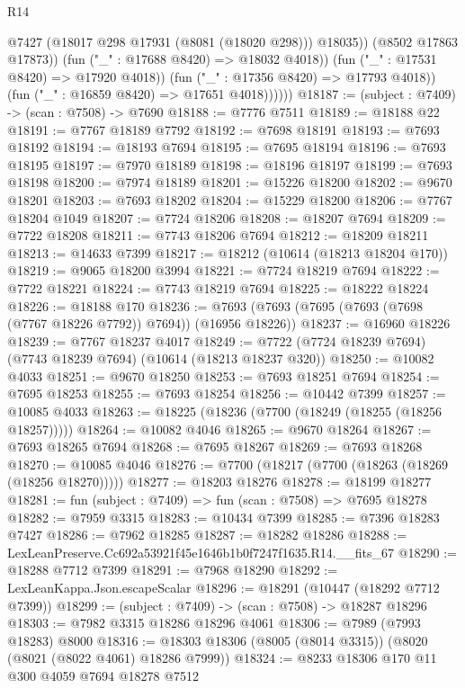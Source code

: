 \begin{lexlean}{R14}
\begin{coremodule}
                          @7427
                          (@18017 @298 @17931 (@8081 (@18020 @298)))
                          @18035))
                      (@8502 @17863 @17873))
                    (fun ("_" : @17688 @8420) => @18032 @4018))
                  (fun ("_" : @17531 @8420) => @17920 @4018))
                (fun ("_" : @17356 @8420) => @17793 @4018))
              (fun ("_" : @16859 @8420) => @17651 @4018))))))
@18187 := (subject : @7409) -> (scan : @7508) -> @7690
@18188 := @7776 @7511
@18189 := @18188 @22
@18191 := @7767 @18189 @7792
@18192 := @7698 @18191
@18193 := @7693 @18192
@18194 := @18193 @7694
@18195 := @7695 @18194
@18196 := @7693 @18195
@18197 := @7970 @18189
@18198 := @18196 @18197
@18199 := @7693 @18198
@18200 := @7974 @18189
@18201 := @15226 @18200
@18202 := @9670 @18201
@18203 := @7693 @18202
@18204 := @15229 @18200
@18206 := @7767 @18204 @1049
@18207 := @7724 @18206
@18208 := @18207 @7694
@18209 := @7722 @18208
@18211 := @7743 @18206 @7694
@18212 := @18209 @18211
@18213 := @14633 @7399
@18217 := @18212 (@10614 (@18213 @18204 @170))
@18219 := @9065 @18200 @3994
@18221 := @7724 @18219 @7694
@18222 := @7722 @18221
@18224 := @7743 @18219 @7694
@18225 := @18222 @18224
@18226 := @18188 @170
@18236 := @7693 (@7693 (@7695 (@7693 (@7698 (@7767 @18226 @7792)) @7694)) (@16956 @18226))
@18237 := @16960 @18226
@18239 := @7767 @18237 @4017
@18249 := @7722 (@7724 @18239 @7694) (@7743 @18239 @7694) (@10614 (@18213 @18237 @320))
@18250 := @10082 @4033
@18251 := @9670 @18250
@18253 := @7693 @18251 @7694
@18254 := @7695 @18253
@18255 := @7693 @18254
@18256 := @10442 @7399
@18257 := @10085 @4033
@18263 := @18225 (@18236 (@7700 (@18249 (@18255 (@18256 @18257)))))
@18264 := @10082 @4046
@18265 := @9670 @18264
@18267 := @7693 @18265 @7694
@18268 := @7695 @18267
@18269 := @7693 @18268
@18270 := @10085 @4046
@18276 := @7700 (@18217 (@7700 (@18263 (@18269 (@18256 @18270)))))
@18277 := @18203 @18276
@18278 := @18199 @18277
@18281 := fun (subject : @7409) => fun (scan : @7508) => @7695 @18278
@18282 := @7959 @3315
@18283 := @10434 @7399
@18285 := @7396 @18283 @7427
@18286 := @7962 @18285
@18287 := @18282 @18286
@18288 := LexLeanPreserve.Cc692a53921f45e1646b1b0f7247f1635.R14.__fits_67
@18290 := @18288 @7712 @7399
@18291 := @7968 @18290
@18292 := LexLeanKappa.Json.escapeScalar
@18296 := @18291 (@10447 (@18292 @7712 @7399))
@18299 := (subject : @7409) -> (scan : @7508) -> @18287 @18296
@18303 := @7982 @3315 @18286 @18296 @4061
@18306 := @7989 (@7993 @18283) @8000
@18316 := @18303 @18306 (@8005 (@8014 @3315)) (@8020 (@8021 (@8022 @4061) @18286 @7999))
@18324 := @8233 @18306 @170 @11 @300 @4059 @7694 @18278 @7512

\end{coremodule}
\end{lexlean}
